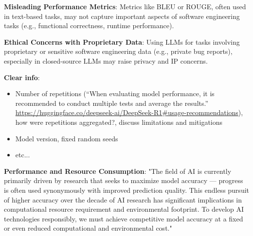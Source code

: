 \textbf{Misleading Performance Metrics}:
Metrics like BLEU or ROUGE, often used in text-based tasks, may not capture important aspects of software engineering tasks (e.g., functional correctness, runtime performance).

\textbf{Ethical Concerns with Proprietary Data}:
Using LLMs for tasks involving proprietary or sensitive software engineering data (e.g., private bug reports), especially in closed-source LLMs may raise privacy and IP concerns.

\textbf{Clear info}:
\begin{itemize}
  \item Number of repetitions (``When evaluating model performance, it is recommended to conduct multiple tests and average the results.'' \url{https://huggingface.co/deepseek-ai/DeepSeek-R1\#usage-recommendations}), how were repetitions aggregated?, discuss limitations and mitigations
  \item Model version, fixed random seeds
  \item etc...
\end{itemize}

\textbf{Performance and Resource Consumption}:
"The field of AI is currently primarily driven by research that seeks to maximize model accuracy — progress is often used synonymously with improved prediction quality. This endless pursuit of higher accuracy over the decade of AI research has significant implications in computational resource requirement and environmental footprint. To develop AI technologies responsibly, we must achieve competitive model accuracy at a fixed or even reduced computational and environmental cost." ~\cite{DBLP:conf/mlsys/WuRGAAMCBHBGGOM22}

